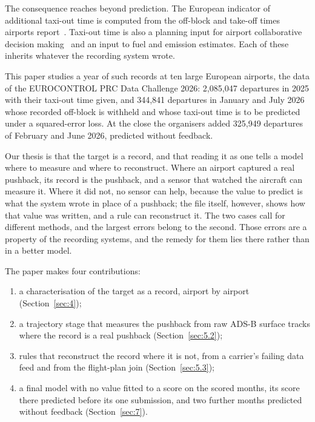 \documentclass[
  manuscript=article,
  layout=preprint,
  year=2026,
  volume=x,
]{extra/joas}
\begin{document}
The consequence reaches beyond prediction. The European indicator of additional taxi-out time is computed from the off-block and take-off times airports report~\cite{eurocontrol_atxot2023}. Taxi-out time is also a planning input for airport collaborative decision making~\cite{eurocontrol_acdm} and an input to fuel and emission estimates. Each of these inherits whatever the recording system wrote.

This paper studies a year of such records at ten large European airports, the data of the EUROCONTROL PRC Data Challenge 2026: 2,085,047 departures in 2025 with their taxi-out time given, and 344,841 departures in January and July 2026 whose recorded off-block is withheld and whose taxi-out time is to be predicted under a squared-error loss. At the close the organisers added 325,949 departures of February and June 2026, predicted without feedback.

Our thesis is that the target is a record, and that reading it as one tells a model where to measure and where to reconstruct. Where an airport captured a real pushback, its record is the pushback, and a sensor that watched the aircraft can measure it. Where it did not, no sensor can help, because the value to predict is what the system wrote in place of a pushback; the file itself, however, shows how that value was written, and a rule can reconstruct it. The two cases call for different methods, and the largest errors belong to the second. Those errors are a property of the recording systems, and the remedy for them lies there rather than in a better model.

The paper makes four contributions:

\begin{enumerate}
\item a characterisation of the target as a record, airport by airport (Section~\ref{sec:4});
\item a trajectory stage that measures the pushback from raw ADS-B surface tracks where the record is a real pushback (Section~\ref{sec:5.2});
\item rules that reconstruct the record where it is not, from a carrier's failing data feed and from the flight-plan join (Section~\ref{sec:5.3});
\item a final model with no value fitted to a score on the scored months, its score there predicted before its one submission, and two further months predicted without feedback (Section~\ref{sec:7}).
\end{enumerate}
\end{document}
